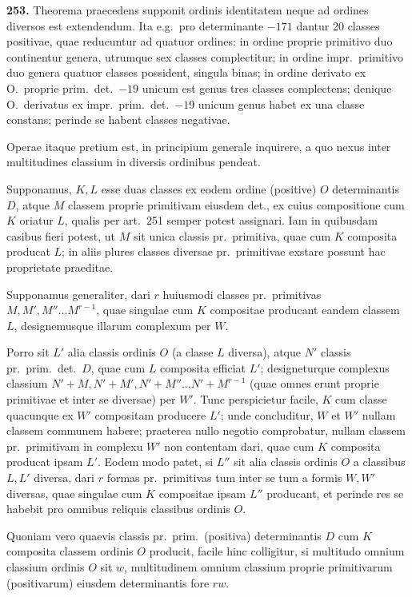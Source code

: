 \documentclass[12pt,a4paper]{article}
\theoremstyle{plain}
\theoremstyle{definition}
\theoremstyle{remark}
\theoremstyle{problemstyle}
\begin{document}
\textbf{253.} Theorema praecedens supponit ordinis identitatem neque ad ordines diversos est extendendum. Ita e.g.\ pro determinante $-171$ dantur 20 classes positivae, quae reducuntur ad quatuor ordines: in ordine proprie primitivo duo continentur genera, utrumque sex classes complectitur; in ordine impr.\ primitivo duo genera quatuor classes possident, singula binas; in ordine derivato ex O.\ proprie prim.\ det.\ $-19$ unicum est genus tres classes complectens; denique O.\ derivatus ex impr.\ prim.\ det.\ $-19$ unicum genus habet ex una classe constans; perinde se habent classes negativae.

Operae itaque pretium est, in principium generale inquirere, a quo nexus inter multitudines classium in diversis ordinibus pendeat.

Supponamus, $K, L$ esse duas classes ex eodem ordine (positive) $O$ determinantis $D$, atque $M$ classem proprie primitivam eiusdem det., ex cuius compositione cum $K$ oriatur $L$, qualis per art.\ 251 semper potest assignari. Iam in quibusdam casibus fieri potest, ut $M$ sit unica classis pr.\ primitiva, quae cum $K$ composita producat $L$; in aliis plures classes diversae pr.\ primitivae exstare possunt hac proprietate praeditae.

Supponamus generaliter, dari $r$ huiusmodi classes pr.\ primitivas $M, M', M'' \ldots M^{r-1}$, quae singulae cum $K$ compositae producant eandem classem $L$, designemusque illarum complexum per $W$.

Porro sit $L'$ alia classis ordinis $O$ (a classe $L$ diversa), atque $N'$ classis pr.\ prim.\ det.\ $D$, quae cum $L$ composita efficiat $L'$; designeturque complexus classium $N' + M, N' + M', N' + M'' \ldots N' + M^{r-1}$ (quae omnes erunt proprie primitivae et inter se diversae) per $W'$. Tunc perspicietur facile, $K$ cum classe quacunque ex $W'$ compositam producere $L'$; unde concluditur, $W$ et $W'$ nullam classem communem habere; praeterea nullo negotio comprobatur, nullam classem pr.\ primitivam in complexu $W'$ non contentam dari, quae cum $K$ composita producat ipsam $L'$. Eodem modo patet, si $L''$ sit alia classis ordinis $O$ a classibus $L, L'$ diversa, dari $r$ formas pr.\ primitivas tum inter se tum a formis $W, W'$ diversas, quae singulae cum $K$ compositae ipsam $L''$ producant, et perinde res se habebit pro omnibus reliquis classibus ordinis $O$.

Quoniam vero quaevis classis pr.\ prim.\ (positiva) determinantis $D$ cum $K$ composita classem ordinis $O$ producit, facile hinc colligitur, si multitudo omnium classium ordinis $O$ sit $w$, multitudinem omnium classium proprie primitivarum (positivarum) eiusdem determinantis fore $rw$.
\end{document}
